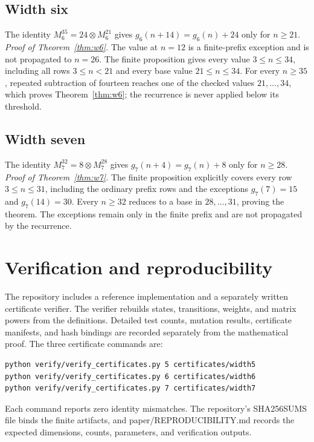 \documentclass[11pt]{article}
\theoremstyle{definition}
\begin{document}
\subsection{Width six}

The identity \(M_6^{35}=24\otimes M_6^{21}\) gives
\(g_6(n+14)=g_6(n)+24\) only for \(n\geq21\). \textit{Proof of
Theorem~\ref{thm:w6}.} The value at \(n=12\) is a finite-prefix exception
and is not propagated to \(n=26\). The finite proposition gives every value
\(3\le n\le34\), including all rows \(3\le n<21\) and every base value
\(21\le n\le34\). For every
\(n\geq35\), repeated subtraction of fourteen reaches one of the checked
values \(21,\ldots,34\), which proves Theorem~\ref{thm:w6}; the recurrence
is never applied below its threshold.

\subsection{Width seven}

The identity \(M_7^{32}=8\otimes M_7^{28}\) gives
\(g_7(n+4)=g_7(n)+8\) only for \(n\geq28\). \textit{Proof of
Theorem~\ref{thm:w7}.} The finite proposition explicitly covers every row
\(3\le n\le31\), including the ordinary prefix rows and the exceptions
\(g_7(7)=15\) and \(g_7(14)=30\). Every \(n\geq32\) reduces to a base in
\(28,\ldots,31\), proving the theorem. The exceptions remain only in the
finite prefix and are not propagated by the recurrence.

\section{Verification and reproducibility}

The repository includes a reference implementation and a separately written
certificate verifier. The verifier rebuilds states, transitions, weights, and
matrix powers from the definitions. Detailed test counts, mutation results,
certificate manifests, and hash bindings are recorded separately from the
mathematical proof.
The three certificate commands are:
\begin{verbatim}
python verify/verify_certificates.py 5 certificates/width5
python verify/verify_certificates.py 6 certificates/width6
python verify/verify_certificates.py 7 certificates/width7
\end{verbatim}
Each command reports zero identity mismatches. The repository’s SHA256SUMS
file binds the finite artifacts, and paper/REPRODUCIBILITY.md records the
expected dimensions, counts, parameters, and verification outputs.
\end{document}
